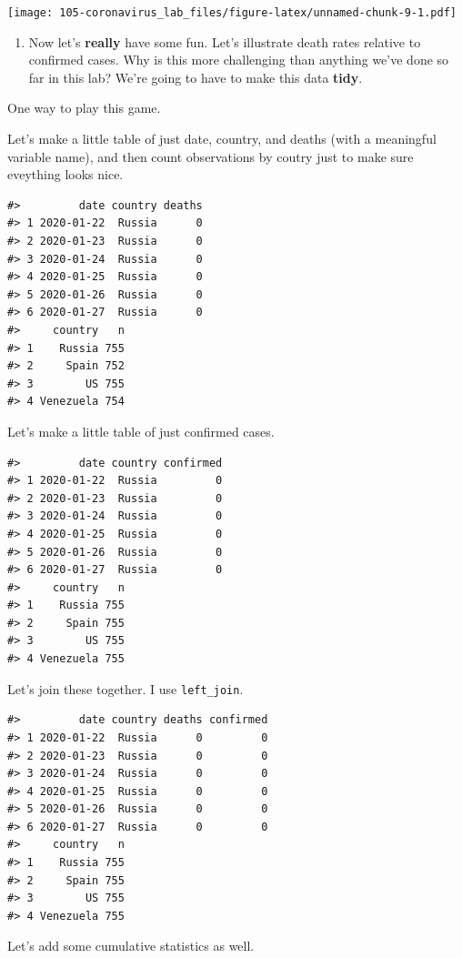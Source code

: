 \documentclass[
]{book}
\providecommand{\tightlist}{%
  \setlength{\itemsep}{0pt}\setlength{\parskip}{0pt}}
\begin{document}
\texttt{[image: 105-coronavirus\_lab\_files/figure-latex/unnamed-chunk-9-1.pdf]}

\begin{enumerate}
\def\labelenumi{\arabic{enumi}.}
\setcounter{enumi}{6}
\tightlist
\item
  Now let's \textbf{really} have some fun. Let's illustrate death rates relative to confirmed cases. Why is this more challenging than anything we've done so far in this lab? We're going to have to make this data \textbf{tidy}.
\end{enumerate}

One way to play this game.

Let's make a little table of just date, country, and deaths (with a meaningful variable name), and then count observations by coutry just to make sure eveything looks nice.

\begin{verbatim}
#>         date country deaths
#> 1 2020-01-22  Russia      0
#> 2 2020-01-23  Russia      0
#> 3 2020-01-24  Russia      0
#> 4 2020-01-25  Russia      0
#> 5 2020-01-26  Russia      0
#> 6 2020-01-27  Russia      0
#>     country   n
#> 1    Russia 755
#> 2     Spain 752
#> 3        US 755
#> 4 Venezuela 754
\end{verbatim}

Let's make a little table of just confirmed cases.

\begin{verbatim}
#>         date country confirmed
#> 1 2020-01-22  Russia         0
#> 2 2020-01-23  Russia         0
#> 3 2020-01-24  Russia         0
#> 4 2020-01-25  Russia         0
#> 5 2020-01-26  Russia         0
#> 6 2020-01-27  Russia         0
#>     country   n
#> 1    Russia 755
#> 2     Spain 755
#> 3        US 755
#> 4 Venezuela 755
\end{verbatim}

Let's join these together. I use \texttt{left\_join}.

\begin{verbatim}
#>         date country deaths confirmed
#> 1 2020-01-22  Russia      0         0
#> 2 2020-01-23  Russia      0         0
#> 3 2020-01-24  Russia      0         0
#> 4 2020-01-25  Russia      0         0
#> 5 2020-01-26  Russia      0         0
#> 6 2020-01-27  Russia      0         0
#>     country   n
#> 1    Russia 755
#> 2     Spain 755
#> 3        US 755
#> 4 Venezuela 755
\end{verbatim}

Let's add some cumulative statistics as well.
\end{document}
